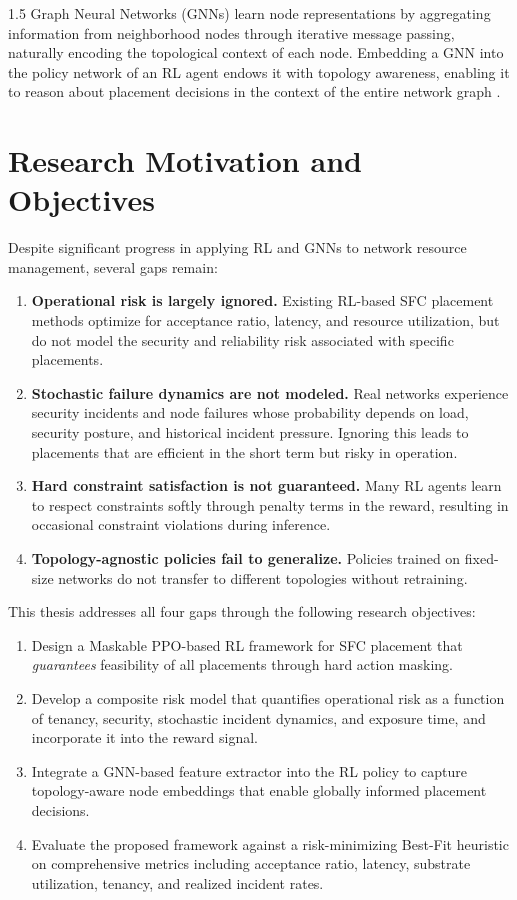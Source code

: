 \documentclass[A4paper,12pt]{report}
\theoremstyle{plain}
\theoremstyle{definition}
\theoremstyle{remark}
\numberwithin{equation}{section}
\begin{document}
\begin{spacing}{1.5}
Graph Neural Networks (GNNs) \cite{kipf2017, velickovic2018, hamilton2017} learn node representations by aggregating information from neighborhood nodes through iterative message passing, naturally encoding the topological context of each node. Embedding a GNN into the policy network of an RL agent endows it with topology awareness, enabling it to reason about placement decisions in the context of the entire network graph \cite{lotfi2022}.

\section{Research Motivation and Objectives}

Despite significant progress in applying RL and GNNs to network resource management, several gaps remain:

\begin{enumerate}
  \item \textbf{Operational risk is largely ignored.} Existing RL-based SFC placement methods optimize for acceptance ratio, latency, and resource utilization, but do not model the security and reliability risk associated with specific placements.
  \item \textbf{Stochastic failure dynamics are not modeled.} Real networks experience security incidents and node failures whose probability depends on load, security posture, and historical incident pressure. Ignoring this leads to placements that are efficient in the short term but risky in operation.
  \item \textbf{Hard constraint satisfaction is not guaranteed.} Many RL agents learn to respect constraints softly through penalty terms in the reward, resulting in occasional constraint violations during inference.
  \item \textbf{Topology-agnostic policies fail to generalize.} Policies trained on fixed-size networks do not transfer to different topologies without retraining.
\end{enumerate}

This thesis addresses all four gaps through the following research objectives:

\begin{enumerate}
  \item Design a Maskable PPO-based RL framework for SFC placement that \textit{guarantees} feasibility of all placements through hard action masking.
  \item Develop a composite risk model that quantifies operational risk as a function of tenancy, security, stochastic incident dynamics, and exposure time, and incorporate it into the reward signal.
  \item Integrate a GNN-based feature extractor into the RL policy to capture topology-aware node embeddings that enable globally informed placement decisions.
  \item Evaluate the proposed framework against a risk-minimizing Best-Fit heuristic on comprehensive metrics including acceptance ratio, latency, substrate utilization, tenancy, and realized incident rates.
\end{enumerate}


\end{spacing}
\end{document}
